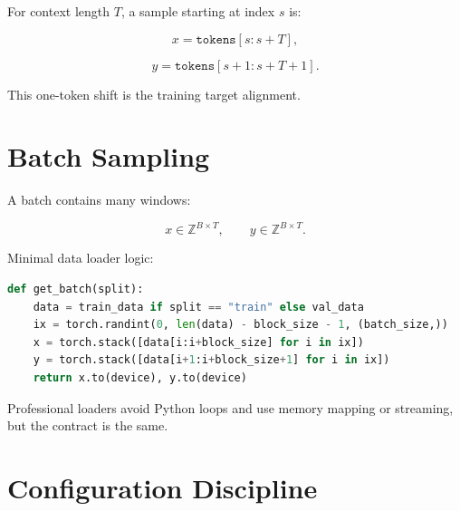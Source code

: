 For context length \(T\), a sample starting at index \(s\) is:

\[
x = \texttt{tokens}[s:s+T],
\]

\[
y = \texttt{tokens}[s+1:s+T+1].
\]

This one-token shift is the training target alignment.

\section{Batch Sampling}

A batch contains many windows:

\[
x\in\mathbb{Z}^{B\times T},
\qquad
y\in\mathbb{Z}^{B\times T}.
\]

\begin{center}
\end{center}

Minimal data loader logic:

\begin{lstlisting}[language=Python]
def get_batch(split):
    data = train_data if split == "train" else val_data
    ix = torch.randint(0, len(data) - block_size - 1, (batch_size,))
    x = torch.stack([data[i:i+block_size] for i in ix])
    y = torch.stack([data[i+1:i+block_size+1] for i in ix])
    return x.to(device), y.to(device)
\end{lstlisting}

Professional loaders avoid Python loops and use memory mapping or streaming, but the contract is the same.

\section{Configuration Discipline}

